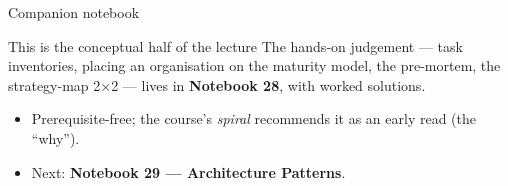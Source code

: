 \documentclass[aspectratio=169,11pt]{beamer}
\begin{document}
\begin{frame}{Companion notebook}
  \begin{exampleblock}{This is the conceptual half of the lecture}
    The hands-on judgement --- task inventories, placing an organisation on the maturity model, the pre-mortem, the strategy-map 2$\times$2 --- lives in \textbf{Notebook 28}, with worked solutions.
  \end{exampleblock}
  \begin{itemize}
    \item Prerequisite-free; the course's \emph{spiral} recommends it as an early read (the ``why'').
    \item Next: \textbf{Notebook 29 --- Architecture Patterns}.
  \end{itemize}
\end{frame}
\end{document}
